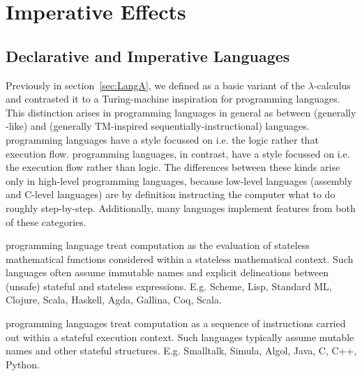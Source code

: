 \chapter{Imperative Effects}
\label{ch:simple-effects}

\section{Declarative and Imperative Languages}
\label{sec:declarative-and-imperative-languages}

Previously in section~\ref{sec:LangA}, we defined \LangA as a basic variant of the $λ$-calculus and contrasted it to a Turing-machine inspiration for programming languages.
This distinction arises in programming languages in general as between  (generally \lc-like) and  (generally TM-inspired sequentially-instructional) languages.
 programming languages have a style focussed on  i.e. the logic rather that execution flow.
 programming languages, in contrast, have a style focussed on  i.e. the execution flow rather than logic.
The differences between these kinds arise only in high-level programming languages, because low-level languages (assembly and C-level languages) are by definition instructing the computer what to do roughly step-by-step.
Additionally, many languages implement features from both of these categories.

\begin{blockdefinition}
   programming language treat computation as the evaluation of stateless mathematical functions considered within a stateless mathematical context.
  Such languages often assume immutable names and explicit delineations between (unsafe) stateful and stateless expressions.
  E.g. Scheme, Lisp, Standard ML, Clojure, Scala, Haskell, Agda, Gallina, Coq, Scala.
\end{blockdefinition}

\begin{blockdefinition}
   programming languages treat computation as a sequence of instructions carried out within a stateful execution context.
  Such languages typically assume mutable names and other stateful structures.
  E.g. Smalltalk, Simula, Algol, Java, C, C++, Python.
\end{blockdefinition}

